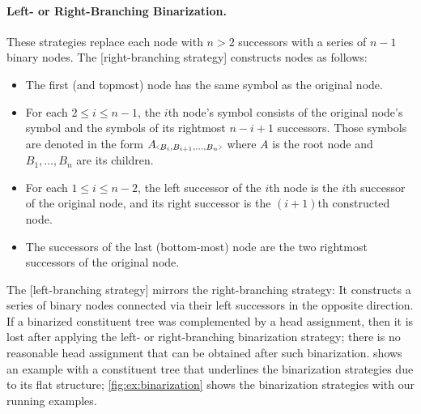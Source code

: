 \documentclass[../../document.tex]{subfiles}
\begin{document}
    \paragraph{Left- or Right-Branching Binarization.}
    These strategies replace each node with \( n>2 \) successors with a series of \( n-1 \) binary nodes.
    The [right-branching strategy]  constructs nodes as follows:
    \begin{itemize}
        \item The first (and topmost) node has the same symbol as the original node.
        \item For each \(2 \leq i \leq n-1\), the \(i\)th node's symbol consists of the original node's symbol and the symbols of its rightmost \(n-i+1\) successors. Those symbols are denoted in the form \(A\binsym{B_i,B_{i+1},\ldots,B_n}\) where \(A\) is the root node and \(B_1, \ldots, B_n\) are its children.
        \item For each \(1 \leq i \leq n-2\), the left successor of the \(i\)th node is the \(i\)th successor of the original node, and its right successor is the \((i+1)\)th constructed node.
        \item The successors of the last (bottom-most) node are the two rightmost successors of the original node.
    \end{itemize}
    The [left-branching strategy]  mirrors the right-branching strategy: It constructs a series of binary nodes connected via their left successors in the opposite direction.
    If a binarized constituent tree was complemented by a head assignment, then it is lost after applying the left- or right-branching binarization strategy; there is no reasonable head assignment that can be obtained after such binarization.
     shows an example with a constituent tree that underlines the binarization strategies due to its flat structure; \cref{fig:ex:binarization} shows the binarization strategies with our running examples.
\end{document}
